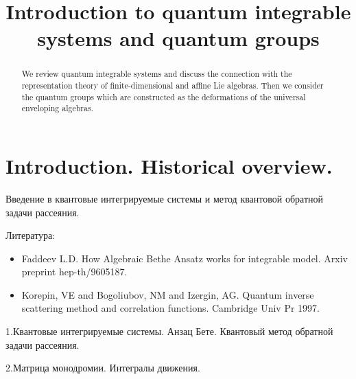 \documentclass[a4paper,12pt]{article}
\theoremstyle{definition} \newtheorem{Def}{Definition}
\theoremstyle{definition} \newtheorem{Def}{Definition}
\begin{document}
\title{Introduction to quantum integrable systems and quantum groups}

\begin{abstract}
  We review quantum integrable systems and discuss the connection with the representation theory of finite-dimensional and affine Lie algebras. Then we consider the quantum groups which are constructed as the deformations of the universal enveloping algebras.
\end{abstract}

\section{Introduction. Historical overview.}
\label{sec:intr-hist-overv}


Введение в квантовые интегрируемые системы и метод квантовой обратной задачи рассеяния. 

Литература:
  \begin{itemize}
  \item Faddeev L.D. How Algebraic Bethe Ansatz works for integrable model. Arxiv preprint hep-th/9605187.
  \item Korepin, VE and Bogoliubov, NM and Izergin, AG. Quantum inverse scattering method and correlation functions. Cambridge Univ Pr 1997.
  \end{itemize}


1.Квантовые интегрируемые системы. Анзац Бете. Квантовый метод обратной задачи рассеяния.

2.Матрица монодромии. Интегралы движения.
{}

\end{document}
